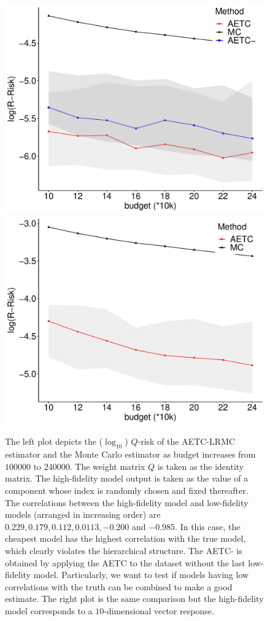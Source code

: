 \documentclass[11pt,a4paper]{amsart}
\numberwithin{equation}{section}
\theoremstyle{plain}
\theoremstyle{definition}
\def\E{{\mathbb E}}
\begin{document}
\begin{figure}[h!]
\centering
  \includegraphics[width=7 cm]{mc2.pdf}
  \includegraphics[width=7 cm]{mc.pdf}
  \caption{The left plot depicts the ($\log_{10}$) $Q$-risk of the AETC-LRMC estimator and the Monte Carlo estimator as budget increases from $100000$ to $240000$. The weight matrix $Q$ is taken as the identity matrix. The high-fidelity model output is taken as the value of a component whose index is randomly chosen and fixed thereafter. The correlations between the high-fidelity model and low-fidelity models (arranged in increasing order) are $0.229, 0.179, 0.112, 0.0113, -0.200$ and $-0.985$. In this case, the cheapest model has the highest correlation with the true model, which clearly violates the hierarchical structure. The AETC- is obtained by applying the AETC to the dataset without the last low-fidelity model. Particularly, we want to test if models having low correlations with the truth can be combined to make a good estimate. The right plot is the same comparison but the high-fidelity model corresponds to a $10$-dimensional vector response. }
  \label{fig:mcmc}
\end{figure}


\printbibliography
\end{document}
